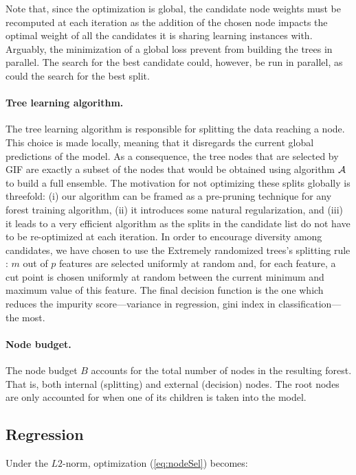 \documentclass{article}
\begin{document}
Note that, since the optimization is global, the  candidate node weights
must be recomputed at each iteration as the addition of the chosen node impacts 
the optimal weight of all the candidates it is sharing learning instances with.
Arguably, the minimization of a global loss prevent from building the trees in 
parallel. The search for the best candidate could, however, be run in parallel, 
as could the search for the best split. 

\paragraph{Tree learning algorithm.}
The tree learning algorithm is responsible for splitting the data
reaching a node. This choice is made locally, meaning that it
disregards the current global predictions of the model. As a
consequence, the tree nodes that are selected by GIF are exactly a
subset of the nodes that would be obtained using algorithm ${\cal A}$
to build a full ensemble. The motivation for not optimizing these
splits globally is threefold: (i) our algorithm can be framed as a
pre-pruning technique for any forest training algorithm, (ii) it
introduces some natural regularization, and (iii) it leads to a very
efficient algorithm as the splits in the candidate list do not have to
be re-optimized at each iteration. In order to encourage diversity
among candidates, we have chosen to use the Extremely randomized
trees's splitting rule \cite{extratrees}: $m$ out of $p$ features are
selected uniformly at random and, for each feature, a cut point is
chosen uniformly at random between the current minimum and maximum
value of this feature. The final decision function is the one which
reduces the impurity score---variance in regression, gini index in
classification---the most.

\paragraph{Node budget.}
The node budget $B$ accounts for the total number of nodes in the resulting 
forest. That is, both internal (splitting) and external (decision) nodes. The 
root nodes are only accounted for when one of its children is taken into the 
model.


\subsection{Regression}
\label{subsec:regression}

Under the $L2$-norm, optimization (\ref{eq:nodeSel}) becomes:
\end{document}
